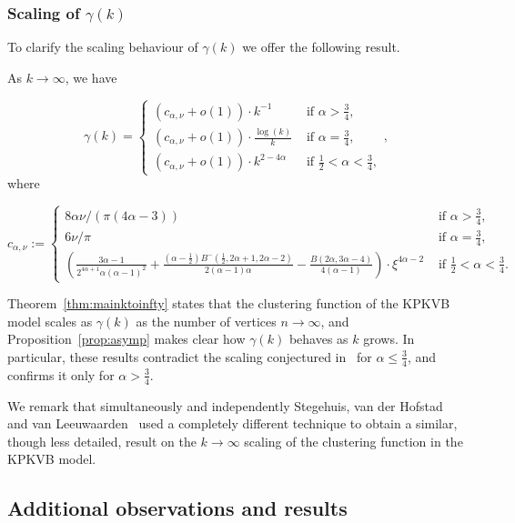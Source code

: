 \subsubsection{Scaling of $\gamma(k)$}


To clarify the scaling behaviour of $\gamma(k)$ we offer the following result.

\begin{proposition}\label{prop:asymp}
As $k\to\infty$, we have

$$ \gamma(k) = 
\left\{ \begin{array}{ll}
(c_{\alpha,\nu}+o(1)) \cdot k^{-1} &\text{ if } \alpha > \frac{3}{4}, \\
(c_{\alpha,\nu}+o(1)) \cdot \frac{\log(k)}{k}& \text{ if } \alpha = \frac{3}{4},\\
(c_{\alpha,\nu}+o(1)) \cdot k^{2-4\alpha} & \text{ if } \frac12 < \alpha < \frac34, 
\end{array} \right.,
$$
where 

$$ c_{\alpha,\nu} := 
\left\{ \begin{array}{cl}
8\alpha \nu / (\pi\left(4\alpha - 3\right)) & \text{ if } \alpha > \frac{3}{4}, \\
6 \nu / \pi & \text{ if } \alpha = \frac{3}{4},\\
 \left( \frac{3\alpha - 1}{2^{4\alpha+1}\alpha(\alpha-1)^2} 
	+ \frac{(\alpha - \frac{1}{2})B^-(\frac{1}{2},2\alpha + 1, 2\alpha - 2)}{2(\alpha - 1)\alpha} 
	- \frac{B(2\alpha, 3\alpha - 4)}{4(\alpha - 1)} \right)  \cdot \xi^{4\alpha-2} 
	& \text{ if } \frac12 < \alpha < \frac34.
\end{array} \right. $$
\end{proposition}

Theorem~\ref{thm:mainktoinfty} states that the clustering function of the KPKVB model scales as $\gamma(k)$ as the number of vertices $n\to\infty$, and
Proposition~\ref{prop:asymp} makes clear how $\gamma(k)$ behaves as $k$ grows.
In particular, these results contradict the scaling conjectured in~\cite{krioukov2010hyperbolic} for 
$\alpha \leq \frac{3}{4}$, and confirms it only for $\alpha > \frac{3}{4}$.

We remark that simultaneously and independently Stegehuis, van der Hofstad and van Leeuwaarden~\cite{stegehuis2019scale} used a completely different technique to obtain a similar, though less detailed, result on the $k\to\infty$ scaling of the clustering function in the KPKVB model.


\subsection{Additional observations and results}


